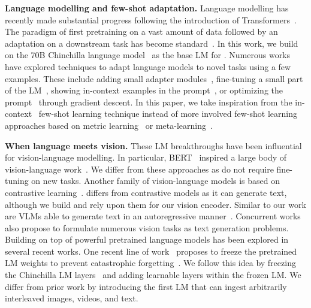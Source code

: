 \textbf{Language modelling and few-shot adaptation.}
Language modelling has recently made substantial progress following the introduction of Transformers~\citep{vaswani2017attention}.
The paradigm of first pretraining on a vast amount of data followed by an adaptation on a downstream task has become standard~\citep{mikolov2010recurrent,graves2013generating,jozefowicz2016exploring,howard2018universal,bert,t5,sutskever2011generating,gpt3}.
In this work, we build on the 70B Chinchilla language model~\citep{chinchilla} as the base LM for \largem{}.
Numerous works have explored techniques to adapt language models to novel tasks using a few examples.
These include adding small adapter modules~\citep{houlsby2019parameter}, fine-tuning a small part of the LM~\citep{zaken_bitfit_2022}, showing in-context examples in the prompt~\citep{gpt3}, or optimizing the prompt~\citep{li2021prefix,lester2021power} through gradient descent.
In this paper, we take inspiration from the in-context~\citep{gpt3} few-shot learning technique instead of more involved few-shot learning approaches based on metric learning~\citep{doersch2020crosstransformers,vinyals2016matching,snell2017prototypical,tian2020rethinking} or meta-learning~\citep{finn2017model,bertinetto2018meta,zintgraf2019fast,requeima2019fast,gordon2018meta,bertinetto2016learning}.

\textbf{When language meets vision.}
These LM breakthroughs have been influential for vision-language modelling.
In particular, BERT~\citep{bert} inspired a large body of vision-language work~\citep{lu2019vilbert,su2019vl,chen2020uniter,hendricks2021decoupling,wang2021vlmo,li2020oscar,tan2019lxmert,zhu2020actbert,wang2021ufo,li2020hero,gan2020large,fu2021violet,zellers2021merlot,zellers2022merlot,singh2021flava,sun2019videobert}.
We differ from these approaches as \methodfamily{} do not require fine-tuning on new tasks.
Another family of vision-language models is based on contrastive learning~\citep{alayrac2020self,clip,align,zhai2021lit,pham2021combined,miech2020end,bain2021frozen,yuan2021florence,li2021align,yao2021filip,jain2021mural}.
\method{} differs from contrastive models as it can generate text,
although we build and rely upon them for our vision encoder.
Similar to our work are VLMs able to generate text in an autoregressive manner~\citep{vinyals2015show,donahue2015long,luo2020univl,hu2021scaling,dai2022}.
Concurrent works~\citep{wang2021simvlm,cho2021unifying,wang2022unifying,zhu2021uni,li2022blip} also propose to formulate numerous vision tasks as text generation problems.
Building on top of powerful pretrained language models has been explored in several recent works.
One recent line of work~\citep{tsimpoukelli2021multimodal,eichenberg2021magma,mokady2021clipcap,luo2022vc,yang2021empirical,zeng2022socraticmodels} proposes to freeze the pretrained LM weights to prevent catastrophic forgetting~\citep{mccloskey1989catastrophic}.
We follow this idea by freezing the Chinchilla LM layers~\citep{chinchilla} and adding learnable layers within the frozen LM.
We differ from prior work by introducing the first LM that can ingest arbitrarily interleaved images, videos, and text.

